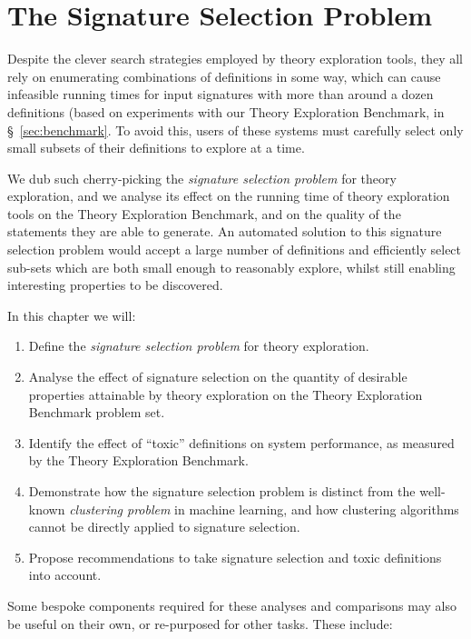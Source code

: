 \chapter{The Signature Selection Problem}
\label{sec:signatureselection}

Despite the clever search strategies employed by theory exploration tools, they
all rely on enumerating combinations of definitions in some way, which can cause
infeasible running times for input signatures with more than around a dozen
definitions (based on experiments with our Theory Exploration Benchmark, in
\S~\ref{sec:benchmark}. To avoid this, users of these systems must carefully
select only small subsets of their definitions to explore at a time.

We dub such cherry-picking the \emph{signature selection problem} for theory
exploration, and we analyse its effect on the running time of theory exploration
tools on the Theory Exploration Benchmark, and on the quality of the statements
they are able to generate. An automated solution to this signature selection
problem would accept a large number of definitions and efficiently select
sub-sets which are both small enough to reasonably explore, whilst still
enabling interesting properties to be discovered.

In this chapter we will:

\begin{enumerate}
\item Define the \emph{signature selection problem} for theory exploration.
\item Analyse the effect of signature selection on the quantity of desirable
  properties attainable by theory exploration on the Theory Exploration
  Benchmark problem set.
\item Identify the effect of ``toxic'' definitions on system performance, as
  measured by the Theory Exploration Benchmark.
\item Demonstrate how the signature selection problem is distinct from the
  well-known \emph{clustering problem} in machine learning, and how clustering
  algorithms cannot be directly applied to signature selection.
\item Propose recommendations to take signature selection and toxic definitions
  into account.
\end{enumerate}

\iffalse
Some bespoke components required for these analyses and comparisons may also be
useful on their own, or re-purposed for other tasks. These include:

